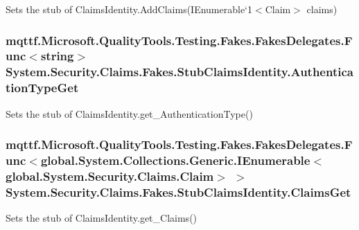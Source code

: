 Sets the stub of Claims\-Identity.\-Add\-Claims(I\-Enumerable`1$<$Claim$>$ claims)

\hypertarget{class_system_1_1_security_1_1_claims_1_1_fakes_1_1_stub_claims_identity_a4ff6555093d4cae7501a931b567dfecf}{
\subsubsection[{Authentication\-Type\-Get}]{\setlength{\rightskip}{0pt plus 5cm}mqttf.\-Microsoft.\-Quality\-Tools.\-Testing.\-Fakes.\-Fakes\-Delegates.\-Func$<$string$>$ System.\-Security.\-Claims.\-Fakes.\-Stub\-Claims\-Identity.\-Authentication\-Type\-Get}}\label{class_system_1_1_security_1_1_claims_1_1_fakes_1_1_stub_claims_identity_a4ff6555093d4cae7501a931b567dfecf}


Sets the stub of Claims\-Identity.\-get\-\_\-\-Authentication\-Type()

\hypertarget{class_system_1_1_security_1_1_claims_1_1_fakes_1_1_stub_claims_identity_af004fd5271ec695e66c4cae96829f9e8}{
\subsubsection[{Claims\-Get}]{\setlength{\rightskip}{0pt plus 5cm}mqttf.\-Microsoft.\-Quality\-Tools.\-Testing.\-Fakes.\-Fakes\-Delegates.\-Func$<$global.\-System.\-Collections.\-Generic.\-I\-Enumerable$<$global.\-System.\-Security.\-Claims.\-Claim$>$ $>$ System.\-Security.\-Claims.\-Fakes.\-Stub\-Claims\-Identity.\-Claims\-Get}}\label{class_system_1_1_security_1_1_claims_1_1_fakes_1_1_stub_claims_identity_af004fd5271ec695e66c4cae96829f9e8}


Sets the stub of Claims\-Identity.\-get\-\_\-\-Claims()

